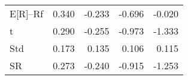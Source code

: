 \begin{tabular}{lrrrr}
\toprule
\midrule
E[R]--Rf & 0.340 & -0.233 & -0.696 & -0.020 \\
t & 0.290 & -0.255 & -0.973 & -1.333 \\
Std & 0.173 & 0.135 & 0.106 & 0.115 \\
SR & 0.273 & -0.240 & -0.915 & -1.253 \\
\bottomrule
\end{tabular}
